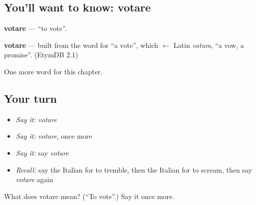 \subsection*{You'll want to know: votare}
\textbf{votare} — \textquotedblleft{}to vote\textquotedblright{}.

\begin{cousinweb}
\textbf{votare} — built from the word for \textquotedblleft{}a vote\textquotedblright{}, which $\leftarrow$ Latin \emph{votum}, \textquotedblleft{}a vow, a promise\textquotedblright{}. (EtymDB 2.1)
\end{cousinweb}

\begin{grammarlens}[title={What you've built}]
One more word for this chapter.
\end{grammarlens}

\subsection*{Your turn}
\begin{itemize}
\raggedright
  \item \emph{Say it:} \emph{votare}
  \item \emph{Say it:} \emph{votare}, once more
  \item \emph{Say it:} say \emph{votare}
  \item \emph{Recall:} say the Italian for to tremble, then the Italian for to scream, then say \emph{votare} again
\end{itemize}

\begin{tcolorbox}[breakable,colback=teal!4,colframe=teal!35!black,title={Before you move on}]
What does votare mean? (\textquotedblleft{}To vote\textquotedblright{}.) Say it once more.
\end{tcolorbox}

